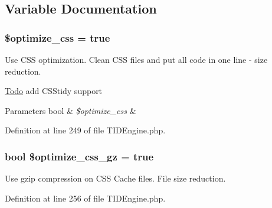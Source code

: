 \subsection{Variable Documentation}
\hypertarget{group__css__cache__settings_ga3d807a2e23ba55310871e3ed6c2bd356}{
\subsubsection[{\$optimize\_\-css}]{\setlength{\rightskip}{0pt plus 5cm}\$optimize\_\-css = true}}
\label{group__css__cache__settings_ga3d807a2e23ba55310871e3ed6c2bd356}
Use CSS optimization. Clean CSS files and put all code in one line -\/ size reduction.\par
\par
 \begin{Desc}
\item[\hyperlink{todo__todo000001}{Todo}]add CSStidy support\end{Desc}



\begin{DoxyParams}[1]{Parameters}
bool & {\em \$optimize\_\-css} & \\
\hline
\end{DoxyParams}


Definition at line 249 of file TIDEngine.php.

\hypertarget{group__css__cache__settings_ga78989c70ad2b35d7026f6600cfe6ba92}{
\subsubsection[{\$optimize\_\-css\_\-gz}]{\setlength{\rightskip}{0pt plus 5cm}bool \$optimize\_\-css\_\-gz = true}}
\label{group__css__cache__settings_ga78989c70ad2b35d7026f6600cfe6ba92}
Use gzip compression on CSS Cache files. File size reduction. 

Definition at line 256 of file TIDEngine.php.

